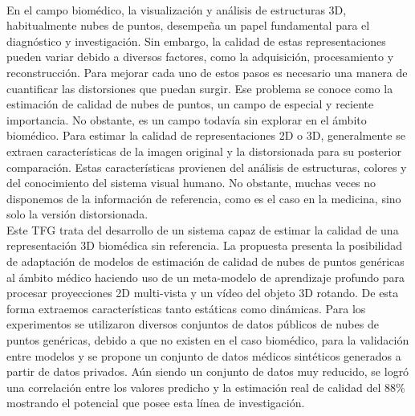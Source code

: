 \chapter*{}


% 


\thispagestyle{empty}

\begin{center}
{\large\bfseries \myTitle}\\
\end{center}
\begin{center}
\myName\\
\end{center}

\\

\\
En el campo biomédico, la visualización y análisis de estructuras 3D, 
habitualmente nubes de puntos, desempeña un papel fundamental para el diagnóstico y investigación. 
Sin embargo, la calidad de estas representaciones pueden variar debido a diversos factores, como la adquisición, procesamiento y reconstrucción. 
Para mejorar cada uno de estos pasos es necesario una manera de cuantificar las distorsiones que puedan surgir. 
Ese problema se conoce como la estimación de calidad de nubes de puntos, 
un campo de especial y reciente importancia. No obstante, 
es un campo todavía sin explorar en el ámbito biomédico.
Para estimar la calidad de representaciones 2D o 3D, generalmente se extraen características de la imagen original y la distorsionada para su posterior 
comparación. Estas características provienen del análisis de estructuras, colores y 
del conocimiento del sistema visual humano. No obstante, 
muchas veces no disponemos de la información de referencia, como es el caso en 
la medicina, sino solo la versión distorsionada.
\\

Este TFG trata del desarrollo de un sistema capaz de estimar la calidad de 
una representación 3D biomédica sin referencia. La propuesta presenta la posibilidad de 
adaptación de modelos de estimación de calidad de nubes de puntos genéricas 
al ámbito médico haciendo uso de un meta-modelo de aprendizaje profundo para 
procesar proyecciones 2D multi-vista y un vídeo del objeto 3D rotando. 
De esta forma extraemos características tanto estáticas como dinámicas.
Para los experimentos se utilizaron diversos conjuntos de datos públicos 
de nubes de puntos genéricas, debido a que no existen en el caso biomédico, 
para la validación entre modelos y se propone un conjunto de datos médicos 
sintéticos generados a partir de datos privados. Aún siendo un conjunto de datos 
muy reducido, se logró una correlación entre los valores predicho y la 
estimación real de calidad del 88\% mostrando el potencial que posee esta línea de investigación.

